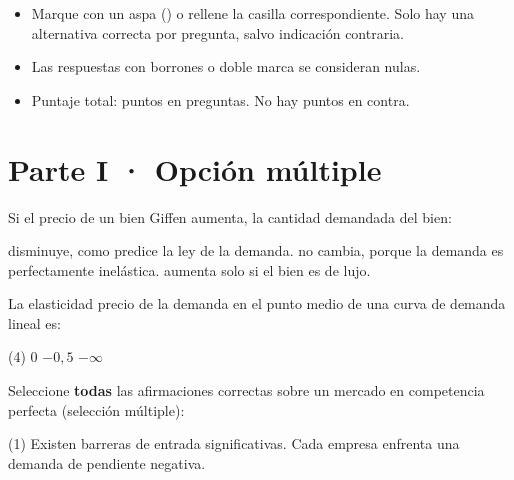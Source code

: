 \documentclass{academic-exam}
\begin{document}
\membrete

\begin{instrucciones}
\begin{itemize}
  \item Marque con un aspa (\texttimes) o rellene la casilla correspondiente.
        Solo hay una alternativa correcta por pregunta, salvo indicación
        contraria.
  \item Las respuestas con borrones o doble marca se consideran nulas.
  \item Puntaje total: \totalpuntos{} puntos en \totalpreguntas{} preguntas.
        No hay puntos en contra.
\end{itemize}
\end{instrucciones}

\section*{\color{colorprimario}Parte I · Opción múltiple}

\begin{pregunta}[2]
Si el precio de un bien Giffen aumenta, la cantidad demandada del bien:
\begin{opciones}
  \opcion disminuye, como predice la ley de la demanda.
  \opcion {}
  \opcion no cambia, porque la demanda es perfectamente inelástica.
  \opcion aumenta solo si el bien es de lujo.
\end{opciones}
\end{pregunta}

\begin{pregunta}[2]
La elasticidad precio de la demanda en el punto medio de una curva de
demanda lineal es:
\begin{opciones}(4)
  \opcion $0$
  \opcion $-0{,}5$
  \opcion {}
  \opcion $-\infty$
\end{opciones}
\end{pregunta}

\begin{pregunta}[2]
Seleccione \textbf{todas} las afirmaciones correctas sobre un mercado en
competencia perfecta (selección múltiple):
\begin{opciones}(1)
  \opcion {}
  \opcion Existen barreras de entrada significativas.
  \opcion {}
  \opcion Cada empresa enfrenta una demanda de pendiente negativa.
\end{opciones}
\end{pregunta}
\end{document}
